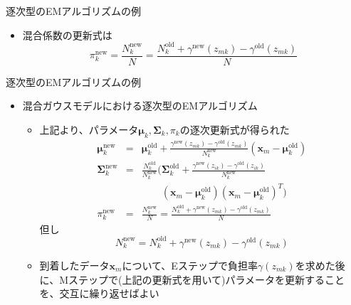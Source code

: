 \documentclass[dvipdfmx,notheorems,t]{beamer}
\begin{document}
\begin{frame}{逐次型のEMアルゴリズムの例}
\begin{itemize}
\begin{itemize}
		\item 混合係数の更新式は
		\begin{equation}
			\pi_k^\mathrm{new} = \frac{N_k^\mathrm{new}}{N} = \frac{N_k^\mathrm{old} + \gamma^\mathrm{new}(z_{mk}) - \gamma^\mathrm{old}(z_{mk})}{N}
		\end{equation}
	\end{itemize}
\end{itemize}

\end{frame}

\begin{frame}{逐次型のEMアルゴリズムの例}
	
\begin{itemize}
	\item 混合ガウスモデルにおける逐次型のEMアルゴリズム
	\begin{itemize}
		\item 上記より、パラメータ$\bm{\mu}_k, \bm{\Sigma}_k, \pi_k$の逐次更新式が得られた
		\begin{eqnarray}
			\bm{\mu}_k^\mathrm{new} &=& \bm{\mu}_k^\mathrm{old} + \frac{\gamma^\mathrm{new}(z_{mk}) - \gamma^\mathrm{old}(z_{mk})}{N_k^\mathrm{new}} \left( \bm{x}_m - \bm{\mu}_k^\mathrm{old} \right) \\
			\bm{\Sigma}_k^\mathrm{new} &=& \frac{N_k^\mathrm{old}}{N_k^\mathrm{new}} \bigg( \bm{\Sigma}_k^\mathrm{old} + \frac{\gamma^\mathrm{new}(z_{ik}) - \gamma^\mathrm{old}(z_{ik})}{N_k^\mathrm{new}} \nonumber \\
			&& \qquad \left( \bm{x}_m - \bm{\mu}_k^\mathrm{old} \right) \left( \bm{x}_m - \bm{\mu}_k^\mathrm{old} \right)^T \bigg) \\
			\pi_k^\mathrm{new} &=& \frac{N_k^\mathrm{new}}{N} = \frac{N_k^\mathrm{old} + \gamma^\mathrm{new}(z_{mk}) - \gamma^\mathrm{old}(z_{mk})}{N}
		\end{eqnarray}
		但し
		\begin{equation}
			N_k^\mathrm{new} = N_k^\mathrm{old} + \gamma^\mathrm{new}(z_{mk}) - \gamma^\mathrm{old}(z_{mk})
		\end{equation}
		\newline
		\item 到着したデータ$\bm{x}_m$について、Eステップで負担率$\gamma(z_{mk})$を求めた後に、Mステップで(上記の更新式を用いて)パラメータを更新することを、交互に繰り返せばよい
	\end{itemize} \
	

\end{itemize}
\end{frame}
\end{document}

